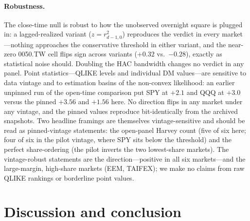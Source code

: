\documentclass[11pt,a4paper]{article}
\begin{document}
\paragraph{Robustness.} The close-time null is robust to how the unobserved overnight square is plugged in: a lagged-realized variant ($z = r^2_{d-1,0}$) reproduces the verdict in every market---nothing approaches the conservative threshold in either variant, and the near-zero 0050.TW cell flips sign across variants ($+0.32$ vs.\ $-0.28$), exactly as statistical noise should.
Doubling the HAC bandwidth changes no verdict in any panel. Point statistics---QLIKE levels and individual DM values---are sensitive to data vintage and to estimation basins of the non-convex likelihood: an earlier unpinned run of the open-time comparison put SPY at $+2.1$ and QQQ at $+3.0$ versus the pinned $+3.56$ and $+1.56$ here. No direction flips in any market under any vintage, and the pinned values reproduce bit-identically from the archived snapshots. Two headline framings are themselves vintage-sensitive and should be read as pinned-vintage statements: the open-panel Harvey count (five of six here; four of six in the pilot vintage, where SPY sits below the threshold) and the perfect share-ordering (the pilot inverts the two lowest-share markets). The vintage-robust statements are the direction---positive in all six markets---and the large-margin, high-share markets (EEM, TAIFEX); we make no claims from raw QLIKE rankings or borderline point values.

\section{Discussion and conclusion}
\end{document}
